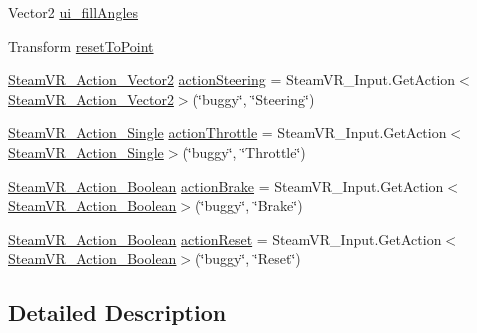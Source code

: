 \begin{DoxyCompactItemize}
\item 
Vector2 \mbox{\hyperlink{class_valve_1_1_v_r_1_1_interaction_system_1_1_sample_1_1_buggy_controller_ac83307b2aeb34b48c578c3a1f2069bde}{ui\+\_\+fill\+Angles}}
\item 
Transform \mbox{\hyperlink{class_valve_1_1_v_r_1_1_interaction_system_1_1_sample_1_1_buggy_controller_a4cfaa5bf43f79a5d77e29f1fa7b66bda}{reset\+To\+Point}}
\item 
\mbox{\hyperlink{class_valve_1_1_v_r_1_1_steam_v_r___action___vector2}{Steam\+V\+R\+\_\+\+Action\+\_\+\+Vector2}} \mbox{\hyperlink{class_valve_1_1_v_r_1_1_interaction_system_1_1_sample_1_1_buggy_controller_a14732cd93ca09edee2bf7528eadcd576}{action\+Steering}} = Steam\+V\+R\+\_\+\+Input.\+Get\+Action$<$\mbox{\hyperlink{class_valve_1_1_v_r_1_1_steam_v_r___action___vector2}{Steam\+V\+R\+\_\+\+Action\+\_\+\+Vector2}}$>$(\char`\"{}buggy\char`\"{}, \char`\"{}Steering\char`\"{})
\item 
\mbox{\hyperlink{class_valve_1_1_v_r_1_1_steam_v_r___action___single}{Steam\+V\+R\+\_\+\+Action\+\_\+\+Single}} \mbox{\hyperlink{class_valve_1_1_v_r_1_1_interaction_system_1_1_sample_1_1_buggy_controller_aafc93db769ee5b46c15239da08b2a505}{action\+Throttle}} = Steam\+V\+R\+\_\+\+Input.\+Get\+Action$<$\mbox{\hyperlink{class_valve_1_1_v_r_1_1_steam_v_r___action___single}{Steam\+V\+R\+\_\+\+Action\+\_\+\+Single}}$>$(\char`\"{}buggy\char`\"{}, \char`\"{}Throttle\char`\"{})
\item 
\mbox{\hyperlink{class_valve_1_1_v_r_1_1_steam_v_r___action___boolean}{Steam\+V\+R\+\_\+\+Action\+\_\+\+Boolean}} \mbox{\hyperlink{class_valve_1_1_v_r_1_1_interaction_system_1_1_sample_1_1_buggy_controller_a539e89906869180eb98c7e048f9886db}{action\+Brake}} = Steam\+V\+R\+\_\+\+Input.\+Get\+Action$<$\mbox{\hyperlink{class_valve_1_1_v_r_1_1_steam_v_r___action___boolean}{Steam\+V\+R\+\_\+\+Action\+\_\+\+Boolean}}$>$(\char`\"{}buggy\char`\"{}, \char`\"{}Brake\char`\"{})
\item 
\mbox{\hyperlink{class_valve_1_1_v_r_1_1_steam_v_r___action___boolean}{Steam\+V\+R\+\_\+\+Action\+\_\+\+Boolean}} \mbox{\hyperlink{class_valve_1_1_v_r_1_1_interaction_system_1_1_sample_1_1_buggy_controller_ac62dfc63df769ac36dca75d2b1b032c8}{action\+Reset}} = Steam\+V\+R\+\_\+\+Input.\+Get\+Action$<$\mbox{\hyperlink{class_valve_1_1_v_r_1_1_steam_v_r___action___boolean}{Steam\+V\+R\+\_\+\+Action\+\_\+\+Boolean}}$>$(\char`\"{}buggy\char`\"{}, \char`\"{}Reset\char`\"{})
\end{DoxyCompactItemize}


\subsection{Detailed Description}


